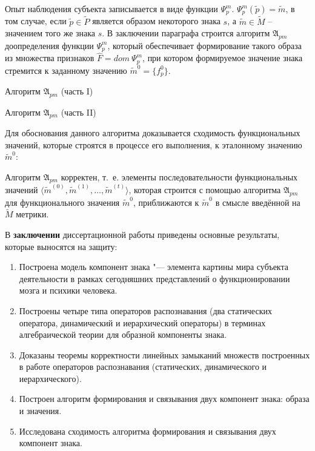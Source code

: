 Опыт наблюдения субъекта записывается в виде функции $\Psi_p^m$. $\Psi_p^m(\tilde p)=\tilde m$, в том случае, если $\tilde p\in\tilde P$ является образом некоторого знака $s$, а $\tilde m\in\tilde M$ -- значением того же знака $s$. В заключении параграфа строится алгоритм $\mathfrak A_{pm}$ доопределения функции $\Psi_p^m$, который обеспечивает формирование такого образа из множества признаков $\hat F=dom\ \Psi_p^m$, при котором формируемое значение знака стремится к заданному значению $\tilde m^0=\{f_p^0\}$.

\begin{algorithm}[h]
	\caption{Алгоритм $\mathfrak{A}_{pm}$ (часть I)}
	\label{alg:cycle_pm_start}
	\begin{algorithmic}[1]
		
	\end{algorithmic}
\end{algorithm}

\begin{algorithm}[h]
	\caption{Алгоритм $\mathfrak{A}_{pm}$ (часть II)}
	\label{alg:cycle_pm_end}
	\begin{algorithmic}[1]
		\algrestore{algst:store2}
		
	\end{algorithmic}
\end{algorithm}

Для обоснования данного алгоритма доказывается сходимость функциональных значений, которые строятся в процессе его выполнения, к эталонному значению $\tilde m^0$:

\begin{Theorem}
	Алгоритм $\mathfrak A_{pm}$ корректен, т.~е. элементы последовательности функциональных значений $\langle\tilde m^{(0)},\tilde m^{(1)},\dots,\tilde m^{(t)}\rangle$, которая строится с помощью алгоритма $\mathfrak A_{pm}$ для функционального значения $\tilde m^0$, приближаются к $\tilde m^0$ в смысле введённой на $\tilde M$ метрики.
\end{Theorem}

В \textbf{заключении} диссертационной работы приведены основные результаты, которые выносятся на защиту:
\begin{enumerate}
	\renewcommand\labelenumi{\theenumi.}
	\item Построена модель компонент знака "--- элемента картины мира субъекта деятельности в рамках сегодняшних представлений о функционировании мозга и психики человека.
	\item Построены четыре типа операторов распознавания (два статических оператора, динамический и иерархический операторы) в терминах алгебраической теории для образной компоненты знака.
	\item Доказаны теоремы корректности линейных замыканий множеств построенных в работе операторов распознавания (статических, динамического и иерархического).
	\item Построен алгоритм формирования и связывания двух компонент знака: образа и значения.
	\item Исследована сходимость алгоритма формирования и связывания двух компонент знака.
\end{enumerate}


